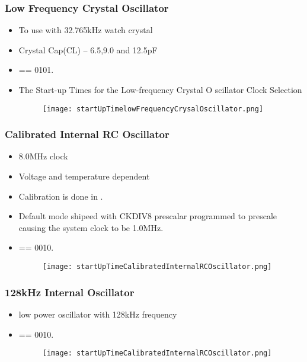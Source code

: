 \subsubsection{Low Frequency Crystal Oscillator}
\begin{itemize}
    \item To use with 32.765kHz watch crystal
    \item Crystal Cap(CL) – 6.5,9.0 and 12.5pF
    \item {} == 0101.
    \item The Start-up Times for the Low-frequency Crystal O scillator Clock Selection
    \begin{figure}[H]
        \begin{center}
            \texttt{[image: startUpTimelowFrequencyCrysalOscillator.png]}
        \end{center}
    \end{figure}
\end{itemize}

\subsubsection{Calibrated Internal RC Oscillator}
\begin{itemize}
    \item 8.0MHz clock
    \item Voltage and temperature dependent
    \item Calibration is done in .
    \item Default mode shipeed with CKDIV8 prescalar programmed to prescale causing the system clock to be 1.0MHz.
    \item {} == 0010.
    \begin{figure}[H]
        \begin{center}
            \texttt{[image: startUpTimeCalibratedInternalRCOscillator.png]}
        \end{center}
    \end{figure}
\end{itemize}

\subsubsection{128kHz Internal Oscillator}
\begin{itemize}
    \item low power oscillator with 128kHz frequency
    \item {} == 0010.
    \begin{figure}[H]
        \begin{center}
            \texttt{[image: startUpTimeCalibratedInternalRCOscillator.png]}
        \end{center}
    \end{figure}
\end{itemize}

